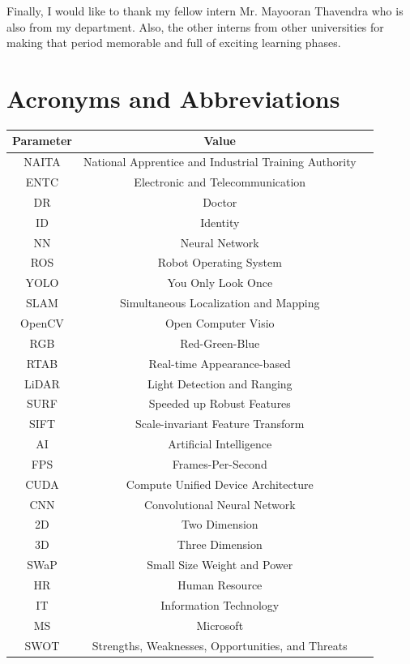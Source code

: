 \documentclass[twoside,12pt,times,onecolumn,a4paper]{report}
\begin{document}
Finally, I would like to thank my fellow intern Mr. Mayooran Thavendra who is also from my department. Also, the other interns from other universities for making that period memorable and full of exciting learning phases. 
\pagebreak

\tableofcontents

\chapter{Acronyms and Abbreviations}
\begin{center}
\begin{longtable}{ |c|c|c| } 
\hline
Parameter & Value \\
\hline
NAITA &  National Apprentice and Industrial Training Authority \\
ENTC &  Electronic and Telecommunication \\
DR & Doctor\\
ID & Identity\\
NN & Neural Network\\
ROS & Robot Operating System \\ 
YOLO & You Only Look Once\\ 
SLAM &  Simultaneous Localization and Mapping\\
OpenCV & Open Computer Visio\\
RGB &  Red-Green-Blue \\
RTAB & Real-time Appearance-based\\
LiDAR &  Light Detection and Ranging \\
SURF & Speeded up Robust Features\\
SIFT & Scale-invariant Feature Transform\\
AI &  Artificial Intelligence \\
FPS &  Frames-Per-Second \\
CUDA & Compute Unified Device Architecture \\
CNN & Convolutional Neural Network \\
2D & Two Dimension\\
3D & Three Dimension\\
SWaP & Small Size Weight and Power \\
HR & Human Resource\\
IT & Information Technology\\
MS & Microsoft\\
SWOT & Strengths, Weaknesses, Opportunities, and Threats\\

\hline
\end{longtable}
\end{center}
\end{document}
